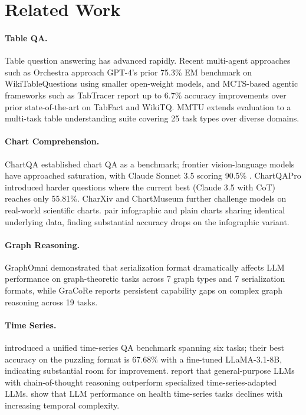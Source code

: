 \documentclass[11pt]{article}
\begin{document}
\section{Related Work}

\paragraph{Table QA.} Table question answering has advanced rapidly. Recent multi-agent approaches such as Orchestra \cite{orchestra2026} approach GPT-4's prior 75.3\% EM benchmark on WikiTableQuestions \cite{pasupat2015compositional} using smaller open-weight models, and MCTS-based agentic frameworks such as TabTracer \cite{tabtracer2026} report up to 6.7\% accuracy improvements over prior state-of-the-art on TabFact \cite{chen2020tabfact} and WikiTQ. MMTU \cite{mmtu2025} extends evaluation to a multi-task table understanding suite covering 25 task types over diverse domains.

\paragraph{Chart Comprehension.} ChartQA \cite{masry2022chartqa} established chart QA as a benchmark; frontier vision-language models have approached saturation, with Claude Sonnet 3.5 scoring 90.5\% \cite{chartqapro2025}. ChartQAPro \cite{chartqapro2025} introduced harder questions where the current best (Claude 3.5 with CoT) reaches only 55.81\%. CharXiv \cite{charxiv2024} and ChartMuseum \cite{chartmuseum2025} further challenge models on real-world scientific charts. \citet{infochartqa2025} pair infographic and plain charts sharing identical underlying data, finding substantial accuracy drops on the infographic variant.

\paragraph{Graph Reasoning.} GraphOmni \cite{graphomni2026} demonstrated that serialization format dramatically affects LLM performance on graph-theoretic tasks across 7 graph types and 7 serialization formats, while GraCoRe \cite{gracore2025} reports persistent capability gaps on complex graph reasoning across 19 tasks.

\paragraph{Time Series.} \citet{tsaqa2026} introduced a unified time-series QA benchmark spanning six tasks; their best accuracy on the puzzling format is 67.68\% with a fine-tuned LLaMA-3.1-8B, indicating substantial room for improvement. \citet{mmtsbench2026} report that general-purpose LLMs with chain-of-thought reasoning outperform specialized time-series-adapted LLMs. \citet{hearts2026} show that LLM performance on health time-series tasks declines with increasing temporal complexity.
\end{document}
